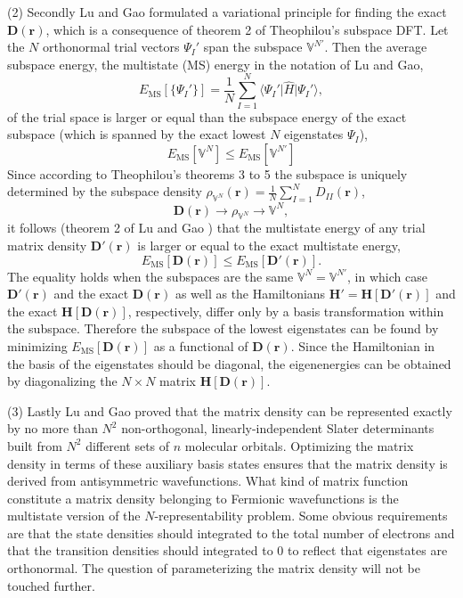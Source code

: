 \documentclass[journal=jpclcd,manuscript=letter]{achemso}
\newcommand\m[1]{\mathbf{#1}}
\renewcommand\vec[1]{\mathbf{#1}}
\begin{document}
(2) Secondly Lu and Gao formulated a variational principle for finding the exact $\m{D}(\vec{r})$, which is a consequence of theorem 2
of Theophilou's subspace DFT. \cite{Theophilou1979}
Let the $N$ orthonormal trial vectors $\Psi_I'$ span the subspace $\mathbb{V}^{N'}$.
Then the average subspace energy, the multistate (MS) energy in the notation of Lu and Gao,
\begin{equation}
  E_{\text{MS}}[\{\Psi_I'\}] = \frac{1}{N} \sum_{I=1}^{N} \langle \Psi_I' \vert \hat{H} \vert \Psi_I' \rangle,
\end{equation}
of the trial space is larger or equal than
the subspace energy of the exact subspace (which is spanned by the exact lowest $N$ eigenstates $\Psi_I$),
\begin{equation}
E_{\text{MS}}[\mathbb{V}^N] \leq E_{\text{MS}}[\mathbb{V}^{N'}]
\end{equation}
Since according to Theophilou's theorems 3 to 5 the subspace is uniquely determined by the subspace density
$\rho_{\mathbb{V}^N}(\vec{r}) = \frac{1}{N} \sum_{I=1}^{N} D_{II}(\vec{r})$,
\begin{equation}
 \m{D}(\vec{r}) \longrightarrow \rho_{\mathbb{V}^N} \longrightarrow \mathbb{V}^N,
\end{equation}
it follows (theorem 2 of Lu and Gao \cite{Lu2022JPCL}) that the multistate energy of any trial matrix density $\m{D}'(\vec{r})$
is larger or equal to the exact multistate energy,
\begin{equation}
 E_{\text{MS}}[\m{D}(\vec{r})] \leq E_{\text{MS}}[\m{D}'(\vec{r})].
\end{equation}
The equality holds when the subspaces are the same $\mathbb{V}^N = \mathbb{V}^{N'}$, in which case $\m{D}'(\vec{r})$ and
the exact $\m{D}(\vec{r})$ as well as the Hamiltonians $\m{H}' = \m{H}[\m{D}'(\vec{r})]$ and the exact $\m{H}[\m{D}(\vec{r})]$, respectively,
 differ only by a basis transformation within the subspace. Therefore the subspace of the lowest eigenstates can be found by minimizing
$E_{\text{MS}}[\m{D}(\vec{r})]$ as a functional of $\m{D}(\vec{r})$.
Since the Hamiltonian in the basis of the eigenstates should be diagonal,
the eigenenergies can be obtained by diagonalizing the $N \times N$ matrix $\m{H}[\m{D}(\vec{r})]$.

(3) Lastly Lu and Gao proved that the matrix density can be represented exactly by no more than $N^2$ non-orthogonal, linearly-independent
Slater determinants built from $N^2$ different sets of $n$ molecular orbitals. \cite{Lu2022JPCL}
Optimizing the matrix density in terms of these auxiliary basis states ensures
that the matrix density is derived from antisymmetric wavefunctions. 
What kind of matrix function constitute a matrix density belonging to Fermionic wavefunctions is the
multistate version of the $N$-representability problem. Some obvious requirements are that the state densities should
integrated to the total number of electrons and that the transition densities should integrated to 0 to reflect that
eigenstates are orthonormal.
The question of parameterizing the matrix density will not be touched further.
\end{document}
